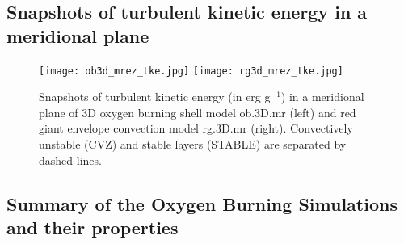 \documentclass[10pt,paper=a4]{report}
\begin{document}
\newpage

\subsection{Snapshots of turbulent kinetic energy in a meridional plane}

\vspace{1.cm}

\begin{figure}[!h]
\centerline{
\texttt{[image: ob3d\_mrez\_tke.jpg]}
\texttt{[image: rg3d\_mrez\_tke.jpg]}}
\caption{Snapshots of turbulent kinetic energy (in erg g$^{-1}$) in a meridional plane of 3D oxygen burning shell model ob.3D.mr (left) and red giant envelope convection model rg.3D.mr (right). Convectively unstable (CVZ) and stable layers (STABLE) are separated by dashed lines.}
\label{fig:ob-rg-tke-cuts}
\end{figure}

\newpage

\subsection{Summary of the Oxygen Burning Simulations and their properties}

\vspace{1.cm}
\end{document}
